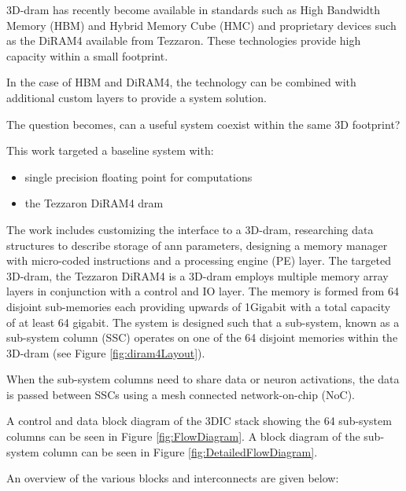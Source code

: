 \documentclass[journal]{IEEEtran}
\begin{document}
3D-\ac{dram} has recently become available in standards such as High Bandwidth Memory (HBM) and Hybrid Memory Cube (HMC) and proprietary devices such as the DiRAM4 available from Tezzaron. 
These technologies provide high capacity within a small footprint.

In the case of HBM and DiRAM4, the technology can be combined with additional custom layers to provide a system solution.

The question becomes, can a useful system coexist within the same 3D footprint?

This work targeted a baseline system with:
\begin{itemize}
  \item single precision floating point for computations
  \item the Tezzaron DiRAM4 \ac{dram} \cite{tezzaron:diram4}

\end{itemize}
The work includes customizing the interface to a 3D-\ac{dram}, researching data structures to describe storage of \ac{ann} parameters, designing a memory manager with micro-coded instructions and a processing engine (PE) layer.  
The targeted 3D-\ac{dram}, the Tezzaron DiRAM4 is a 3D-\ac{dram} employs multiple memory array layers in conjunction with a control and IO layer.
The memory is formed from 64 disjoint sub-memories each providing upwards of 1Gigabit with a total capacity of at least 64 gigabit.
The system is designed such that a sub-system, known as a sub-system column (SSC) operates on one of the 64 disjoint memories within the 3D-\ac{dram} (see Figure \ref{fig:diram4Layout}).

When the sub-system columns need to share data or neuron activations, the data is passed between SSCs using a mesh connected network-on-chip (NoC).

\bigskip
A control and data block diagram of the 3DIC stack showing the 64 sub-system columns can be seen in Figure \ref{fig:FlowDiagram}.
A block diagram of the sub-system column can be seen in Figure \ref{fig:DetailedFlowDiagram}. 

\bigskip
An overview of the various blocks and interconnects are given below:

\end{document}
